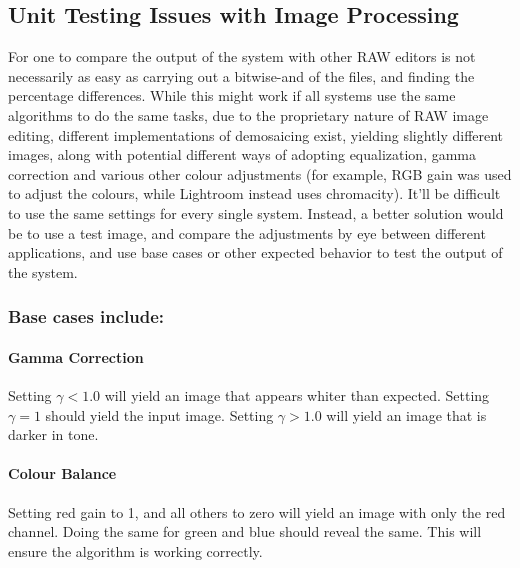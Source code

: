 \documentclass[10pt,a4paper]{article}
\begin{document}
\subsection{Unit Testing Issues with Image Processing}

For one to compare the output of the system with other RAW editors is not necessarily as easy as carrying out a bitwise-and  of the files, and finding the percentage
differences. While this might work if all systems use the same algorithms to do the same tasks, due to the proprietary nature of RAW image editing,
different implementations of demosaicing exist, yielding slightly different images, along with potential different ways of adopting equalization,
gamma correction and various other colour adjustments (for example, RGB gain was used to adjust the colours, while Lightroom instead uses chromacity).
It'll be difficult to use the same settings for every single system. Instead, a better solution would be to use a test image, and compare the adjustments
by eye between different applications, and use base cases or other expected behavior to test the output of the system.

\subsubsection{Base cases include:}
\paragraph{Gamma Correction}
Setting $\gamma < 1.0$ will yield an image that appears whiter than expected. Setting $\gamma = 1$ should yield the input image.
Setting $\gamma > 1.0$ will yield an image that is darker in tone. 

\paragraph{Colour Balance}
Setting red gain to 1, and all others to zero will yield an image with only the red channel. Doing the same for green and blue should reveal the same.
This will ensure the algorithm is working correctly.
\end{document}
